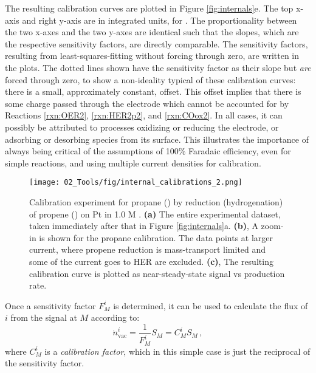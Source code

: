 The resulting calibration curves are plotted in Figure \ref{fig:internals}e. The top x-axis and right y-axis are in integrated units, for . The proportionality between the two x-axes and the two y-axes are identical such that the slopes, which are the respective sensitivity factors, are directly comparable. The sensitivity factors, resulting from least-squares-fitting without forcing through zero, are written in the plots. The dotted lines shown have the sensitivity factor as their slope but \textit{are} forced through zero, to show a non-ideality typical of these calibration curves: there is a small, approximately constant, offset. This offset implies that there is some charge passed through the electrode which cannot be accounted for by Reactions \ref{rxn:OER2}, \ref{rxn:HER2p2}, and \ref{rxn:COox2}. In all cases, it can possibly be attributed to processes oxidizing or reducing the electrode, or adsorbing or desorbing species from its surface. This illustrates the importance of always being critical of the assumptions of 100\% Faradaic efficiency, even for simple reactions, and using multiple current densities for calibration.
\begin{figure}[t]
	\texttt{[image: 02\_Tools/fig/internal\_calibrations\_2.png]}
	\caption{Calibration experiment for propane () by reduction (hydrogenation) of propene () on Pt in 1.0 M . \textbf{(a)} The entire experimental dataset, taken immediately after that in Figure \ref{fig:internals}a. \textbf{(b)}, A zoom-in is shown for the propane calibration. The data points at larger current, where propene reduction is mass-transport limited and some of the current goes to HER are excluded. \textbf{(c)}, The resulting calibration curve is plotted as near-steady-state signal vs production rate.
	}
	\label{fig:internals_2}
\end{figure}
Once a sensitivity factor $F_M^i$ is determined, it can be used to calculate the flux of $i$ from the signal at $M$ according to:
\begin{equation}
\dot{n}^i_{\text{vac}} = \frac{1}{F_M^i} S_M = C_M^i S_M\,,
\end{equation}
where $C_M^i$ is a \textit{calibration factor}, which in this simple case is just the reciprocal of the sensitivity factor.

